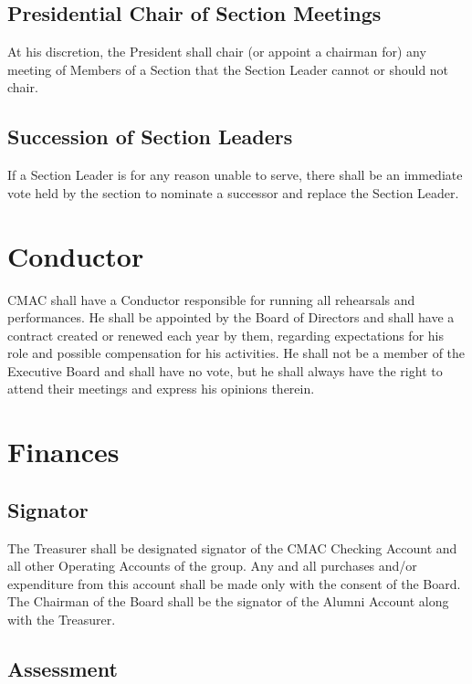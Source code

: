 \documentclass{article}
\begin{document}
\subsection{Presidential Chair of Section Meetings}

At his discretion, the President shall chair (or appoint a chairman
for) any meeting of Members of a Section that the Section Leader cannot
or should not chair.

\subsection{Succession of Section Leaders}

If a Section Leader is for any reason unable to serve, there shall
be an immediate vote held by the section to nominate a successor and
replace the Section Leader.

\section{Conductor}

CMAC shall have a Conductor responsible for running all rehearsals
and performances. He shall be appointed by the Board of Directors
and shall have a contract created or renewed each year by them, regarding
expectations for his role and possible compensation for his activities.
He shall not be a member of the Executive Board and shall have no
vote, but he shall always have the right to attend their meetings
and express his opinions therein.

\section{Finances}

\subsection{Signator}

The Treasurer shall be designated signator of the CMAC Checking Account
and all other Operating Accounts of the group. Any and all purchases
and/or expenditure from this account shall be made only with the consent
of the Board. The Chairman of the Board shall be the signator of the
Alumni Account along with the Treasurer.

\subsection{Assessment}
\end{document}
